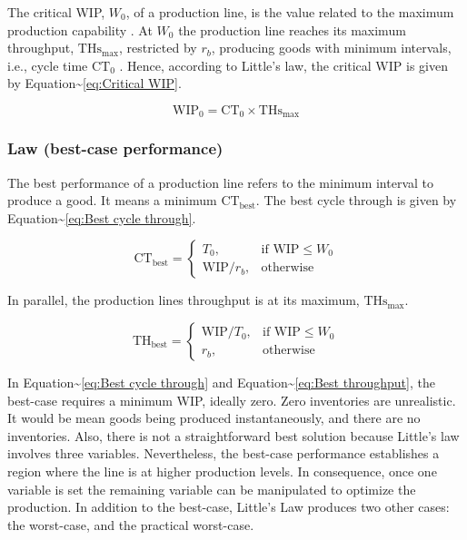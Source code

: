 \documentclass{article}
\begin{document}
The critical WIP, \(W_0\), of a production line, is the value related to the maximum production capability \citep[p.219]{Hopp2001}.
At \(W_0\) the production line reaches its maximum throughput, \(\mbox{THs}_{\mbox{max}}\), restricted by \(r_b\), producing goods with minimum intervals, i.e., cycle time \(\mbox{CT}_0\) \citep{Martin1998}.
Hence, according to Little's law, the critical WIP is given by Equation\textasciitilde{}\ref{eq:Critical WIP}.

\begin{equation}\label{eq:Critical WIP}
  \mbox{WIP}_0 = \mbox{CT}_0 \times \mbox{THs}_{\mbox{max}}
\end{equation}

\subsubsection{Law (best-case performance)}
\label{sec:orgb037dc0}

The best performance of a production line refers to the minimum interval to produce a good.
It means a minimum \(\mbox{CT}_{\mbox{best}}\).
The best cycle through is given by Equation\textasciitilde{}\ref{eq:Best cycle through}.

\begin{equation}\label{eq:Best cycle through}
    \mbox{CT}_{\mbox{best}}=
    \begin{cases}
 T_0,  & \mbox{if }\mbox{WIP} \le W_0\\
  \mbox{WIP}/r_b, & \mbox{otherwise }
    \end{cases}
\end{equation}

In parallel, the production lines throughput is at its maximum, \(\mbox{THs}_{\mbox{max}}\).

\begin{equation}\label{eq:Best throughput}
    \mbox{TH}_{\mbox{best}}=
    \begin{cases}
 \mbox{WIP}/T_0,  & \mbox{if }\mbox{WIP} \le W_0\\
  r_b, & \mbox{otherwise }
    \end{cases}
\end{equation}

In Equation\textasciitilde{}\ref{eq:Best cycle through} and Equation\textasciitilde{}\ref{eq:Best throughput}, the best-case requires a minimum WIP, ideally zero.
Zero inventories are unrealistic.
It would be mean goods being produced instantaneously, and there are no inventories.
Also, there is not a straightforward best solution because Little's law involves three variables.
Nevertheless, the best-case performance establishes a region where the line is at higher production levels.
In consequence, once one variable is set the remaining variable can be manipulated to optimize the production.
In addition to the best-case, Little's Law produces two other cases: the worst-case, and the practical worst-case.
\end{document}
